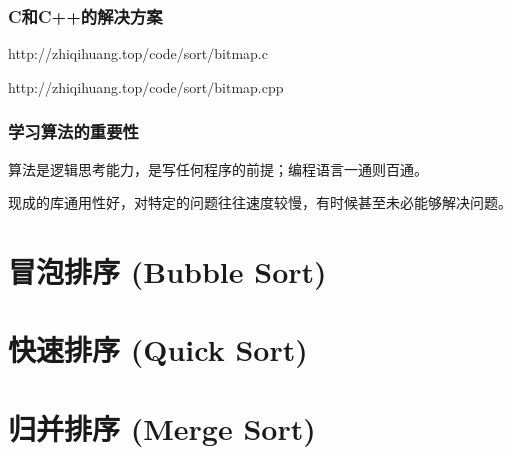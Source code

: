 \documentclass[CJK,14pt]{beamer}
\begin{document}
  \begin{frame}
\frametitle{C和C++的解决方案}


http://zhiqihuang.top/code/sort/bitmap.c

\skiplines

http://zhiqihuang.top/code/sort/bitmap.cpp

  \end{frame}
  
  \begin{frame}
    \frametitle{学习算法的重要性}
    \bitem
  \item{算法是逻辑思考能力，是写任何程序的前提；编程语言一通则百通。}
  \item{现成的库通用性好，对特定的问题往往速度较慢，有时候甚至未必能够解决问题。}
    \eitem
  \end{frame}
  
  
  \section{冒泡排序 (Bubble Sort)}

  \begin{frame}
    \frametitle{}
  \end{frame}

  \section{快速排序 (Quick Sort)}

  \begin{frame}
    \frametitle{}
  \end{frame}

  \section{归并排序 (Merge Sort)}

  \begin{frame}
    \frametitle{}
  \end{frame}
  
\ech
\end{document}
